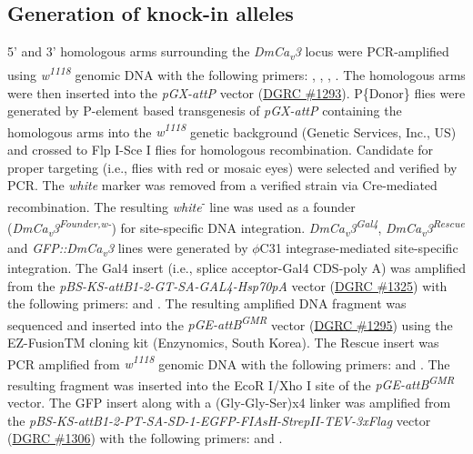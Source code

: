 \subsection*{Generation of knock-in alleles}

5' and 3' homologous arms surrounding the \emph{DmCa\textsubscript{v}3} locus were PCR-amplified using \emph{w\textsuperscript{1118}} genomic DNA with the following primers: , , , .
The homologous arms were then inserted into the \emph{pGX-attP} vector (\href{https://dgrc.bio.indiana.edu/product/View?product=1293}{DGRC \#1293}).
P\{Donor\} flies were generated by P-element based transgenesis of \emph{pGX-attP} containing the homologous arms into the \emph{w\textsuperscript{1118}} genetic background (Genetic Services, Inc., US) and crossed to Flp I-Sce I flies for homologous recombination.
Candidate for proper targeting (i.e., flies with red or mosaic eyes) were selected and verified by PCR.
The \emph{white} marker was removed from a verified strain via Cre-mediated recombination.
The resulting \emph{white}\textsuperscript{-} line was used as a founder (\emph{DmCa\textsubscript{v}3\textsuperscript{Founder,w-}}) for site-specific DNA integration.
\emph{DmCa\textsubscript{v}3\textsuperscript{Gal4}}, \emph{DmCa\textsubscript{v}3\textsuperscript{Rescue}} and \emph{GFP::DmCa\textsubscript{v}3} lines were generated by $\phi$C31 integrase-mediated site-specific integration. 
The Gal4 insert (i.e., splice acceptor-Gal4 CDS-poly A) was amplified from the \emph{pBS-KS-attB1-2-GT-SA-GAL4-Hsp70pA} vector (\href{https://dgrc.bio.indiana.edu/product/View?product=1325}{DGRC \#1325}) with the following primers:  and . 
The resulting amplified DNA fragment was sequenced and inserted into the \emph{pGE-attB\textsuperscript{GMR}} vector (\href{https://dgrc.bio.indiana.edu/product/View?product=1295}{DGRC \#1295}) using the EZ-FusionTM cloning kit (Enzynomics, South Korea). 
The Rescue insert was PCR amplified from \emph{w\textsuperscript{1118}} genomic DNA with the following primers:  and .
The resulting fragment was inserted into the EcoR I/Xho I site of the \emph{pGE-attB\textsuperscript{GMR}} vector. 
The GFP insert along with a (Gly-Gly-Ser)x4 linker was amplified from the \emph{pBS-KS-attB1-2-PT-SA-SD-1-EGFP-FIAsH-StrepII-TEV-3xFlag} vector (\href{https://dgrc.bio.indiana.edu/product/View?product=1306}{DGRC \#1306}) with the following primers:  and .
